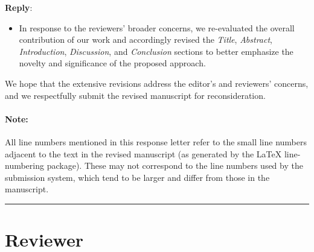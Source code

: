 \documentclass[11pt]{article}
\newcounter{reviewer}
\newenvironment{reply}
   {\medskip \noindent \color{blue} \begin{sf}\textbf{Reply}:\  }
   {\medskip \par \end{sf}}
\newcommand{\reviewersection}{\stepcounter{reviewer} \bigskip \hrule
                  \section*{Reviewer \thereviewer}}
\begin{document}
\begin{reply}
\begin{itemize}
  \item In response to the reviewers’ broader concerns, we re-evaluated the overall contribution of our work and accordingly revised the \textit{Title}, \textit{Abstract}, \textit{Introduction}, \textit{Discussion}, and \textit{Conclusion} sections to better emphasize the novelty and significance of the proposed approach.
\end{itemize}

We hope that the extensive revisions address the editor’s and reviewers’ concerns, and we respectfully submit the revised manuscript for reconsideration.

\end{reply}

\paragraph{Note:} All line numbers mentioned in this response letter refer to the small line numbers adjacent to the text in the revised manuscript (as generated by the \LaTeX{} line-numbering package). These may not correspond to the line numbers used by the submission system, which tend to be larger and differ from those in the manuscript.

\reviewersection
\end{document}
